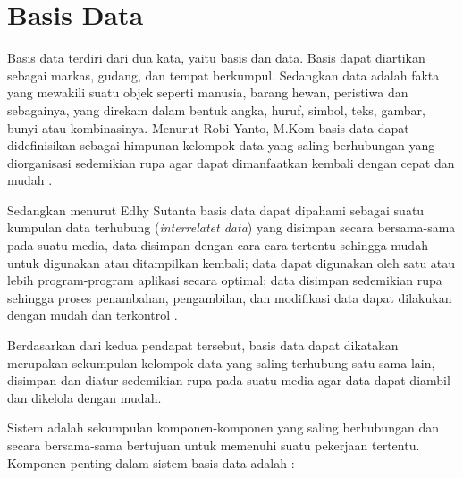\section{Basis Data} 

Basis data terdiri dari dua kata, yaitu basis dan data. Basis dapat diartikan sebagai markas, gudang, dan tempat berkumpul. Sedangkan data adalah fakta yang mewakili suatu objek seperti manusia, barang hewan, peristiwa dan sebagainya, yang direkam dalam bentuk angka, huruf, simbol, teks, gambar, bunyi atau kombinasinya. Menurut Robi Yanto, M.Kom basis data dapat didefinisikan sebagai himpunan kelompok data yang saling berhubungan yang diorganisasi sedemikian rupa agar dapat dimanfaatkan kembali dengan cepat dan mudah \cite{Robi}. 

Sedangkan menurut Edhy Sutanta basis data dapat dipahami sebagai suatu kumpulan data terhubung (\textit{interrelatet data}) yang disimpan secara bersama-sama pada suatu media, data disimpan dengan cara-cara tertentu sehingga mudah untuk digunakan atau ditampilkan kembali; data dapat digunakan oleh satu atau lebih program-program aplikasi secara optimal; data disimpan sedemikian rupa sehingga proses penambahan, pengambilan, dan modifikasi data dapat dilakukan dengan mudah dan terkontrol \cite{Edhy}. 

Berdasarkan dari kedua pendapat tersebut, basis data dapat dikatakan merupakan sekumpulan kelompok data yang saling terhubung satu sama lain, disimpan dan diatur sedemikian rupa pada suatu media agar data dapat diambil dan dikelola dengan mudah. 

Sistem adalah sekumpulan komponen-komponen yang saling berhubungan dan secara bersama-sama bertujuan untuk memenuhi suatu pekerjaan tertentu. Komponen penting dalam sistem basis data adalah \cite{Robi}:

